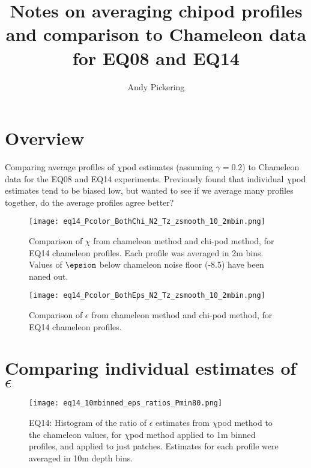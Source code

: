 \documentclass[11pt]{article}
\title{Notes on averaging chipod profiles and comparison to Chameleon data for EQ08 and EQ14}
\author{Andy Pickering}
\begin{document}
\maketitle

\tableofcontents
\newpage

\section{Overview}

Comparing average profiles of $\chi$pod estimates (assuming $\gamma=0.2$) to Chameleon data for the EQ08 and EQ14 experiments. Previously found that individual $\chi$pod estimates tend to be biased low, but wanted to see if we average many profiles together, do the average profiles agree better?


\begin{figure}[htbp]
\texttt{[image: eq14\_Pcolor\_BothChi\_N2\_Tz\_zsmooth\_10\_2mbin.png]}
\caption{Comparison of $\chi$ from chameleon method and chi-pod method, for EQ14 chameleon profiles. Each profile was averaged in 2m bins.  Values of $\epsion$ below chameleon noise floor (-8.5) have been naned out.}
\label{}
\end{figure}

\begin{figure}[htbp]
\texttt{[image: eq14\_Pcolor\_BothEps\_N2\_Tz\_zsmooth\_10\_2mbin.png]}
\caption{Comparison of $\epsilon$ from chameleon method and chi-pod method, for EQ14 chameleon profiles.}
\label{}
\end{figure}



\clearpage
\section{Comparing individual estimates of $\epsilon$}




\begin{figure}[htbp]
\texttt{[image: eq14\_10mbinned\_eps\_ratios\_Pmin80.png]}
\caption{EQ14: Histogram of the ratio of $\epsilon$ estimates from $\chi$pod method to the chameleon values, for $\chi$pod method applied to 1m binned profiles, and applied to just patches. Estimates for each profile were averaged in 10m depth bins.}
\label{epsrathist_eq14}
\end{figure}
\end{document}

